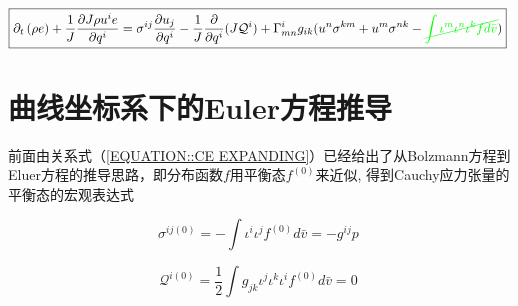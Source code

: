 \documentclass[LBMDerivation.tex]{subfiles}
\begin{document}
\begin{equation}
  \begin{gathered}
    \boxed{
    \partial_{t}\left(\rho e\right) + \frac{1}{J}\frac{\partial J \rho u^i e}{\partial  q^{i}}    =  \sigma^{ij}  \frac{\partial  u_j}{\partial q^{i}} - \frac{1}{J}\frac{\partial}{\partial q^{i}} (J \mathcal{Q}^i) + \Gamma^i_{mn}  g_{ik} ( u^n \sigma^{km}+u^m \sigma^{nk} -  {\color{green} \cancel{\int \iota^m \iota^n  \iota^{k} f  d \bar{v}}})
    }
  \end{gathered}
  \label{动量方程输运形式4} ~
\end{equation}






\section{曲线坐标系下的Euler方程推导}




前面由关系式（\ref{EQUATION::CE EXPANDING}）已经给出了从Bolzmann方程到Eluer方程的推导思路，即分布函数$f$用平衡态$f^{(0)}$来近似, 得到Cauchy应力张量的平衡态的宏观表达式

\begin{equation}
  \sigma^{ij(0)} =-\int \iota^{i} \iota^{j} f^{(0)}  d \bar{v}= -g^{ij} p
  \label{EQUATION::Cauchy应力张量1} ~
\end{equation}


\begin{equation}
  \mathcal{Q}^{i (0)} =\frac{1}{2}\int g_{jk} \iota^{j} \iota^{k}  \iota^{i} f^{(0)}  d \bar{v}= 0
  \label{EQUATION::heat flux} ~
\end{equation}





%
%




%
%
%
%

%
%
\end{document}
